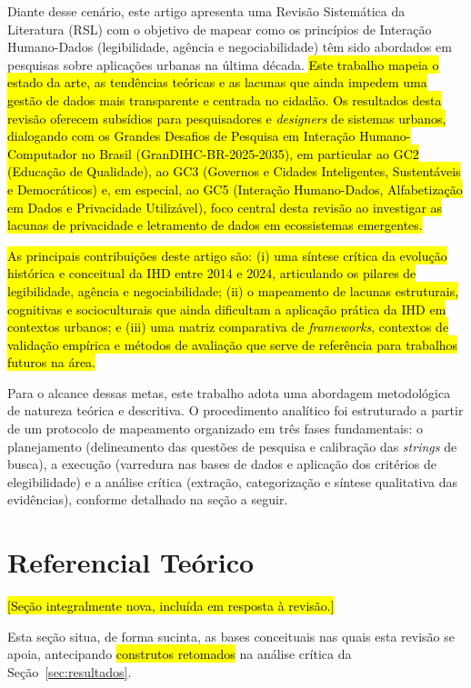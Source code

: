 \documentclass[12pt]{article}
\begin{document}
    Diante desse cenário, este artigo apresenta uma Revisão Sistemática da Literatura (RSL) com o objetivo de mapear como os princípios de Interação Humano-Dados (legibilidade, agência e negociabilidade) \cite{mortier2015humandatainteractionhumanface} têm sido abordados em pesquisas sobre aplicações urbanas na última década. \hl{Este trabalho mapeia o estado da arte, as tendências teóricas e as lacunas que ainda impedem uma gestão de dados mais transparente e centrada no cidadão. Os resultados desta revisão oferecem subsídios para pesquisadores e \textit{designers} de sistemas urbanos, dialogando com os Grandes Desafios de Pesquisa em Interação Humano-Computador no Brasil (GranDIHC-BR-2025-2035), em particular ao GC2 (Educação de Qualidade), ao GC3 (Governos e Cidades Inteligentes, Sustentáveis e Democráticos) e, em especial, ao GC5 (Interação Humano-Dados, Alfabetização em Dados e Privacidade Utilizável), foco central desta revisão ao investigar as lacunas de privacidade e letramento de dados em ecossistemas emergentes.}

    \hl{As principais contribuições deste artigo são: (i) uma síntese crítica da evolução histórica e conceitual da IHD entre 2014 e 2024, articulando os pilares de legibilidade, agência e negociabilidade; (ii) o mapeamento de lacunas estruturais, cognitivas e socioculturais que ainda dificultam a aplicação prática da IHD em contextos urbanos; e (iii) uma matriz comparativa de \textit{frameworks}, contextos de validação empírica e métodos de avaliação que serve de referência para trabalhos futuros na área.}

    Para o alcance dessas metas, este trabalho adota uma abordagem metodológica de natureza teórica e descritiva. O procedimento analítico foi estruturado a partir de um protocolo de mapeamento organizado em três fases fundamentais: o planejamento (delineamento das questões de pesquisa e calibração das \textit{strings} de busca), a execução (varredura nas bases de dados e aplicação dos critérios de elegibilidade) e a análise crítica (extração, categorização e síntese qualitativa das evidências), conforme detalhado na seção a seguir.
    

\section{Referencial Teórico}
\label{sec:referencial}

\hl{[Seção integralmente nova, incluída em resposta à revisão.]}

Esta seção situa, de forma sucinta, as bases conceituais nas quais esta revisão se apoia, antecipando \hl{construtos retomados} na análise crítica da Seção~\ref{sec:resultados}.
\end{document}
